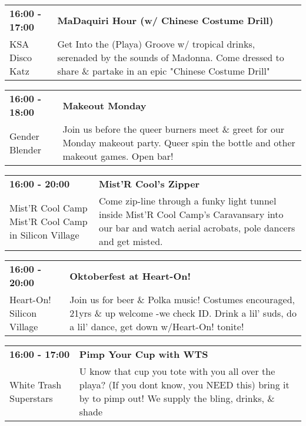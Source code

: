 \begin{tabular}{ p{1in} p{2.2in} }
    \textbf{16:00 - 17:00} & \textbf{MaDaquiri Hour (w/ Chinese Costume Drill)} \\
    KSA Disco Katz \newline  & Get Into the (Playa) Groove w/ tropical drinks, serenaded by the sounds of Madonna. Come dressed to share \& partake in an epic "Chinese Costume Drill" \\
    \hline 
\end{tabular}
    
\begin{tabular}{ p{1in} p{2.2in} }
    \textbf{16:00 - 18:00} & \textbf{Makeout Monday} \\
    Gender Blender \newline  & Join us before the queer burners meet \& greet for our Monday makeout party.
Queer spin the bottle and other makeout games. Open bar! \\
    \hline 
\end{tabular}
    
\begin{tabular}{ p{1in} p{2.2in} }
    \textbf{16:00 - 20:00} & \textbf{Mist'R Cool's Zipper} \\
    Mist'R Cool Camp \newline Mist'R Cool Camp in Silicon Village & Come zip-line through a funky light tunnel inside Mist'R Cool Camp's Caravansary into our bar and watch aerial acrobats, pole dancers and get misted. \\
    \hline 
\end{tabular}
    
\begin{tabular}{ p{1in} p{2.2in} }
    \textbf{16:00 - 20:00} & \textbf{Oktoberfest at Heart-On!} \\
    Heart-On! \newline Silicon Village & Join us for beer \& Polka music! Costumes encouraged, 21yrs \& up welcome -we check ID. Drink a lil' suds, do a lil' dance, get down w/Heart-On! tonite! \\
    \hline 
\end{tabular}
    
\begin{tabular}{ p{1in} p{2.2in} }
    \textbf{16:00 - 17:00} & \textbf{Pimp Your Cup with WTS} \\
    White Trash Superstars \newline  & U know that cup you tote with you all over the playa? (If you dont know, you NEED this) bring it by to pimp out! We supply the bling, drinks, \& shade \\
    \hline 
\end{tabular}
    
